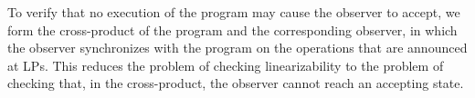


To verify that no execution of the program may cause the observer to
accept, we form
the cross-product of the program  and the corresponding
observer, in which the observer synchronizes with the program on the operations
that are announced at LPs. This reduces the
problem of checking linearizability to the problem of checking
that, in the cross-product, the observer cannot reach an accepting state.

